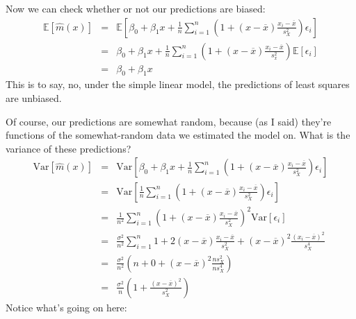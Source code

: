 \documentclass{article}
\newcommand{\Expect}[1]{\mathbb{E}\left[ #1 \right]}
\newcommand{\Var}[1]{\mathrm{Var}\left[ #1 \right]}
\begin{document}
Now we can check whether or not our predictions are biased:
\begin{eqnarray}
\Expect{\hat{m}(x)} & = & \Expect{\beta_0 + \beta_1 x + \frac{1}{n}\sum_{i=1}^{n}{\left(1 + (x-\overline{x}) \frac{x_i - \overline{x}}{s^2_X} \right) \epsilon_i}}\\
& = & \beta_0 + \beta_1 x + \frac{1}{n}\sum_{i=1}^{n}{\left(1 + (x-\overline{x})\frac{x_i - \overline{x}}{s^2_x}\right)\Expect{\epsilon_i}}\\
& = & \beta_0 + \beta_1 x
\end{eqnarray}
This is to say, no, under the simple linear model, the predictions of
least squares are unbiased.

Of course, our predictions are somewhat random, because (as I said) they're
functions of the somewhat-random data we estimated the model on.  What is
the variance of these predictions?
\begin{eqnarray}
\Var{\hat{m}(x)} & = & \Var{\beta_0 + \beta_1 x + \frac{1}{n}\sum_{i=1}^{n}{\left(1 + (x-\overline{x}) \frac{x_i - \overline{x}}{s^2_X} \right) \epsilon_i}}\\
& = & \Var{\frac{1}{n}\sum_{i=1}^{n}{\left(1 + (x-\overline{x}) \frac{x_i - \overline{x}}{s^2_X} \right) \epsilon_i}}\\
& = & \frac{1}{n^2}\sum_{i=1}^{n}{\left(1 + (x-\overline{x}) \frac{x_i - \overline{x}}{s^2_X} \right)^2 \Var{\epsilon_i}}\\
& = & \frac{\sigma^2}{n^2}\sum_{i=1}^{n}{1 + 2 (x-\overline{x})\frac{x_i - \overline{x}}{s^2_X} + (x-\overline{x})^2 \frac{(x_i - \overline{x})^2}{s^4_X} }\\
& = & \frac{\sigma^2}{n^2}\left(n + 0 + (x-\overline{x})^2\frac{ ns^2_X}{n s^4_X}\right)\\
& = & \frac{\sigma^2}{n}\left(1 + \frac{(x-\overline{x})^2}{s^2_X}\right)
\label{eqn:variance-of-prediction}
\end{eqnarray}
Notice what's going on here:
\end{document}
